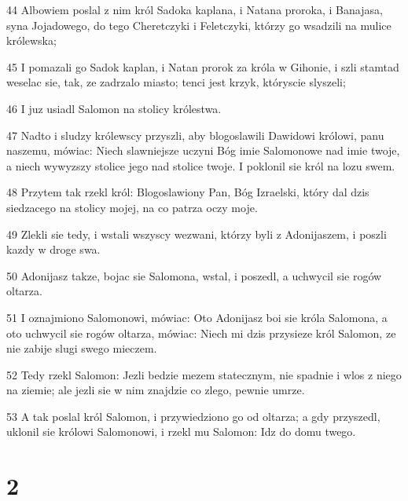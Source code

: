 \par 44 Albowiem poslal z nim król Sadoka kaplana, i Natana proroka, i Banajasa, syna Jojadowego, do tego Cheretczyki i Feletczyki, którzy go wsadzili na mulice królewska;
\par 45 I pomazali go Sadok kaplan, i Natan prorok za króla w Gihonie, i szli stamtad weselac sie, tak, ze zadrzalo miasto; tenci jest krzyk, któryscie slyszeli;
\par 46 I juz usiadl Salomon na stolicy królestwa.
\par 47 Nadto i sludzy królewscy przyszli, aby blogoslawili Dawidowi królowi, panu naszemu, mówiac: Niech slawniejsze uczyni Bóg imie Salomonowe nad imie twoje, a niech wywyzszy stolice jego nad stolice twoje. I poklonil sie król na lozu swem.
\par 48 Przytem tak rzekl król: Blogoslawiony Pan, Bóg Izraelski, który dal dzis siedzacego na stolicy mojej, na co patrza oczy moje.
\par 49 Zlekli sie tedy, i wstali wszyscy wezwani, którzy byli z Adonijaszem, i poszli kazdy w droge swa.
\par 50 Adonijasz takze, bojac sie Salomona, wstal, i poszedl, a uchwycil sie rogów oltarza.
\par 51 I oznajmiono Salomonowi, mówiac: Oto Adonijasz boi sie króla Salomona, a oto uchwycil sie rogów oltarza, mówiac: Niech mi dzis przysieze król Salomon, ze nie zabije slugi swego mieczem.
\par 52 Tedy rzekl Salomon: Jezli bedzie mezem statecznym, nie spadnie i wlos z niego na ziemie; ale jezli sie w nim znajdzie co zlego, pewnie umrze.
\par 53 A tak poslal król Salomon, i przywiedziono go od oltarza; a gdy przyszedl, uklonil sie królowi Salomonowi, i rzekl mu Salomon: Idz do domu twego.

\chapter{2}

